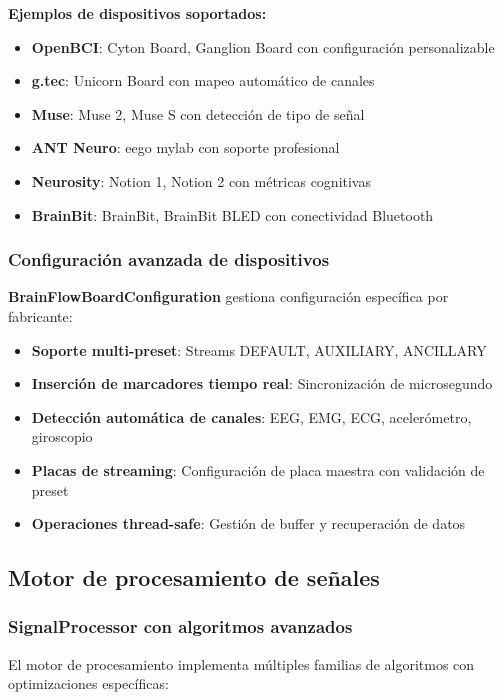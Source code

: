 \textbf{Ejemplos de dispositivos soportados:}
\begin{itemize}
    \item \textbf{OpenBCI}: Cyton Board, Ganglion Board con configuración personalizable
    \item \textbf{g.tec}: Unicorn Board con mapeo automático de canales
    \item \textbf{Muse}: Muse 2, Muse S con detección de tipo de señal
    \item \textbf{ANT Neuro}: eego mylab con soporte profesional
    \item \textbf{Neurosity}: Notion 1, Notion 2 con métricas cognitivas
    \item \textbf{BrainBit}: BrainBit, BrainBit BLED con conectividad Bluetooth
\end{itemize}

\subsubsection{Configuración avanzada de dispositivos}

\textbf{BrainFlowBoardConfiguration} gestiona configuración específica por fabricante:
\begin{itemize}
    \item \textbf{Soporte multi-preset}: Streams DEFAULT, AUXILIARY, ANCILLARY
    \item \textbf{Inserción de marcadores tiempo real}: Sincronización de microsegundo
    \item \textbf{Detección automática de canales}: EEG, EMG, ECG, acelerómetro, giroscopio
    \item \textbf{Placas de streaming}: Configuración de placa maestra con validación de preset
    \item \textbf{Operaciones thread-safe}: Gestión de buffer y recuperación de datos
\end{itemize}

\subsection{Motor de procesamiento de señales}
\label{subsec:motor_procesamiento_eeg}

\subsubsection{SignalProcessor con algoritmos avanzados}

El motor de procesamiento implementa múltiples familias de algoritmos con optimizaciones específicas:

